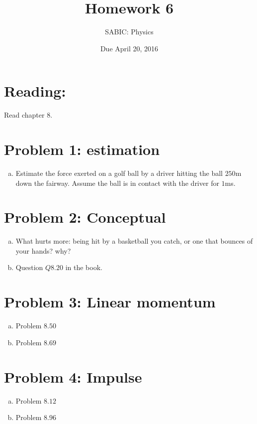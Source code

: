 \documentclass[10pt,letter]{article}
\begin{document}


\title{Homework 6}

\author{SABIC: Physics}

\date{Due April 20, 2016}
 
\maketitle 

\section*{Reading:}
Read chapter 8.
\section*{Problem 1: estimation}
\begin{enumerate}[(a)]
\item Estimate the force exerted on a golf ball by a driver hitting the ball $250$m down the fairway. Assume the ball is in contact with the driver for $1$ms.
\end{enumerate}
\section*{Problem 2: Conceptual}
\begin{enumerate}[(a)]
\item What hurts more: being hit by a basketball you catch, or one that bounces of your hands? why?
\item Question $Q8.20$ in the book.
\end{enumerate}
\section*{Problem 3: Linear momentum}
\begin{enumerate}[(a)]
\item Problem $8.50$
\item Problem $8.69$
\end{enumerate}
\section*{Problem 4: Impulse}
\begin{enumerate}[(a)]
\item Problem $8.12$
\item Problem $8.96$
\end{enumerate}
\end{document}
